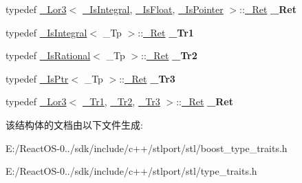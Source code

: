 \begin{DoxyCompactItemize}
\item 
\mbox{\label{struct___default_zero_value_afa15836543d9a1b9567435cf63272b21}} 
typedef \hyperlink{struct___lor3}{\+\_\+\+Lor3}$<$ \hyperlink{struct____true__type}{\+\_\+\+Is\+Integral}, \hyperlink{struct____true__type}{\+\_\+\+Is\+Float}, \hyperlink{struct____true__type}{\+\_\+\+Is\+Pointer} $>$\+::\hyperlink{struct____true__type}{\+\_\+\+Ret} {\bfseries \+\_\+\+Ret}
\item 
\mbox{\label{struct___default_zero_value_a42365be7c9d3491bae341bf83ddf0ce8}} 
typedef \hyperlink{struct____true__type}{\+\_\+\+Is\+Integral}$<$ \+\_\+\+Tp $>$\+::\hyperlink{struct____true__type}{\+\_\+\+Ret} {\bfseries \+\_\+\+Tr1}
\item 
\mbox{\label{struct___default_zero_value_a96a8b4df916b09bc2900fe384c6bbbd3}} 
typedef \hyperlink{struct___is_rational}{\+\_\+\+Is\+Rational}$<$ \+\_\+\+Tp $>$\+::\hyperlink{struct____true__type}{\+\_\+\+Ret} {\bfseries \+\_\+\+Tr2}
\item 
\mbox{\label{struct___default_zero_value_af63ae2fd7005ff879c500c69aa9d22a1}} 
typedef \hyperlink{struct___is_ptr}{\+\_\+\+Is\+Ptr}$<$ \+\_\+\+Tp $>$\+::\hyperlink{struct____true__type}{\+\_\+\+Ret} {\bfseries \+\_\+\+Tr3}
\item 
\mbox{\label{struct___default_zero_value_abac6bff6adce61fe4cf4169611e72ed0}} 
typedef \hyperlink{struct___lor3}{\+\_\+\+Lor3}$<$ \hyperlink{struct____true__type}{\+\_\+\+Tr1}, \hyperlink{struct____true__type}{\+\_\+\+Tr2}, \hyperlink{struct____true__type}{\+\_\+\+Tr3} $>$\+::\hyperlink{struct____true__type}{\+\_\+\+Ret} {\bfseries \+\_\+\+Ret}
\end{DoxyCompactItemize}


该结构体的文档由以下文件生成\+:\begin{DoxyCompactItemize}
\item 
E\+:/\+React\+O\+S-\/0../sdk/include/c++/stlport/stl/boost\+\_\+type\+\_\+traits.\+h\item 
E\+:/\+React\+O\+S-\/0../sdk/include/c++/stlport/stl/type\+\_\+traits.\+h\end{DoxyCompactItemize}
